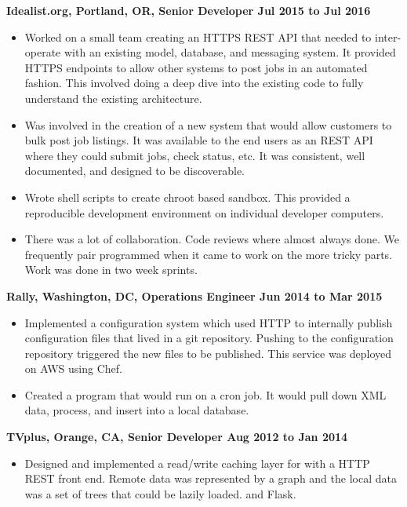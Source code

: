 \documentclass{res}
\begin{document}
\begin{resume}
  {\large \bf Idealist.org, Portland, OR, Senior Developer \hfill Jul 2015 to Jul 2016}
  \begin{itemize}
    \item
    Worked on a small team creating an HTTPS REST API that needed
    to inter-operate with an existing model, database, and messaging
    system. It provided HTTPS endpoints to allow other systems to post
    jobs in an automated fashion.  This involved doing
    a deep dive into the existing code to fully understand the existing
    architecture.
    \item
    Was involved in the creation of a new system that would allow
    customers to bulk post job listings.  It was available to the end users
    as an REST API where they could submit jobs, check status, etc.
    It was consistent, well documented, and designed to be discoverable.
    \item
    Wrote shell scripts to create chroot based sandbox.  This provided
    a reproducible development environment on individual developer
    computers.
    \item
    There was a lot of collaboration.  Code reviews where almost always
    done.  We frequently pair programmed when it came to work on the
    more tricky parts.  Work was done in two week sprints.
  \end{itemize}

  {\large \bf Rally, Washington, DC, Operations Engineer \hfill Jun 2014 to Mar 2015}

  \begin{itemize}

  \item
    Implemented a configuration system which used HTTP to
    internally publish configuration files that lived in a git repository.
    Pushing to the configuration repository triggered the new files
    to be published.  This service was deployed on AWS using Chef.
  \item
    Created a program that would run on a cron job.  It would pull down
    XML data, process, and insert into a local database.
  \end{itemize}

  {\large \bf TVplus, Orange, CA, Senior Developer \hfill Aug 2012 to Jan 2014}

  \begin{itemize}

  \item
    Designed and implemented a read/write caching layer for with a
    HTTP REST front end.
    Remote data was represented by a graph and the
    local data was a set of trees that could be lazily loaded. 
    and Flask.


\end{itemize}
\end{resume}
\end{document}
